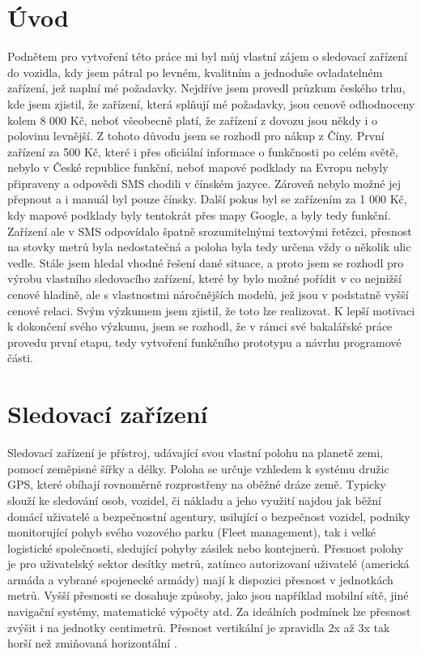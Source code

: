 \documentclass[FM,BP]{tulthesis}  %
\begin{document}

\chapter{Úvod}
Podnětem pro vytvoření této práce mi byl můj vlastní zájem o sledovací zařízení do vozidla, kdy jsem pátral po levném, kvalitním a jednoduše ovladatelném zařízení, jež naplní mé požadavky. Nejdříve jsem provedl průzkum českého trhu, kde jsem zjistil, že zařízení, která splňují mé požadavky, jsou cenově odhodnoceny kolem 8 000 Kč, neboť všeobecně platí, že zařízení z dovozu jsou někdy i o polovinu levnější. Z tohoto důvodu jsem se rozhodl pro nákup z Číny. První zařízení za 500 Kč, které i přes oficiální informace o funkčnosti po celém světě, nebylo v České republice funkční, neboť mapové podklady na Evropu nebyly připraveny a odpovědi SMS chodili v čínském jazyce. Zároveň nebylo možné jej přepnout a i manuál byl pouze čínsky. Další pokus byl se zařízením za 1 000 Kč, kdy mapové podklady byly tentokrát přes mapy Google, a byly tedy funkční. Zařízení ale v SMS odpovídalo špatně srozumitelnými textovými řetězci, přesnost na stovky metrů byla nedostatečná a poloha byla tedy určena vždy o několik ulic vedle. Stále jsem hledal vhodné řešení dané situace, a proto jsem se rozhodl pro výrobu vlastního sledovacího zařízení, které by bylo možné pořídit v co nejnižší cenové hladině, ale s vlastnostmi náročnějších modelů, jež jsou v podstatně vyšší cenové relaci. Svým výzkumem jsem zjistil, že toto lze realizovat. K lepší motivaci k dokončení svého výzkumu, jsem se rozhodl, že v rámci své bakalářské práce provedu první etapu, tedy vytvoření funkčního prototypu a návrhu programové části.


\chapter{Sledovací zařízení}
Sledovací zařízení je přístroj, udávající svou vlastní polohu na planetě zemi, pomocí zeměpisné šířky a délky. Poloha se určuje vzhledem k systému družic GPS, které obíhají rovnoměrně rozprostřeny na oběžné dráze země. Typicky slouží ke sledování osob, vozidel, či nákladu a jeho využití najdou jak běžní domácí uživatelé a bezpečnostní agentury, usilující o bezpečnost vozidel, podniky monitorující pohyb svého vozového parku (Fleet management), tak i  velké logistické společnosti, sledující pohyby zásilek nebo kontejnerů. Přesnost polohy je pro uživatelský sektor desítky metrů, zatímco autorizovaní uživatelé (americká armáda a vybrané spojenecké armády) mají k dispozici přesnost v jednotkách metrů. Vyšší přesnosti se dosahuje způsoby, jako jsou například mobilní sítě, jiné navigační systémy, matematické výpočty atd. Za ideálních podmínek lze přesnost zvýšit i na jednotky centimetrů. Přesnost vertikální je zpravidla 2x až 3x tak horší než zmiňovaná horizontální \cite{gpsCommon}.
\end{document}
